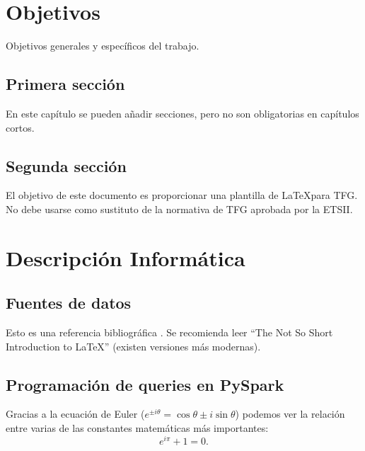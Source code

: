 \documentclass[12pt,twoside,titlepage]{report}
\newcommand\blankpage{%
    \newpage
    \null
    \thispagestyle{empty}%
    \newpage}
\begin{document}







\chapter{Objetivos}


Objetivos generales y específicos del trabajo.


\section{Primera sección}

En este capítulo se pueden añadir secciones, pero no son obligatorias en capítulos cortos.

\section{Segunda sección}

El objetivo de este documento es proporcionar una plantilla de \LaTeX para TFG. No debe usarse como sustituto de la normativa de TFG aprobada por la ETSII.


\blankpage






\chapter{Descripción Informática}
\label{chap:contenidos}




\section{Fuentes de datos}

Esto es una referencia bibliográfica \cite{bibex}. Se recomienda leer ``The Not So Short Introduction to \LaTeX'' \cite{Oetiker2007} (existen versiones más modernas).


\section{Programación de queries en PySpark}

Gracias a la ecuación de Euler ($e^{ \pm i\theta } = \cos \theta \pm i\sin \theta$) podemos ver la relación entre varias de las constantes matemáticas más importantes:
\[
    e^{i\pi} + 1 = 0.
\]
\end{document}
